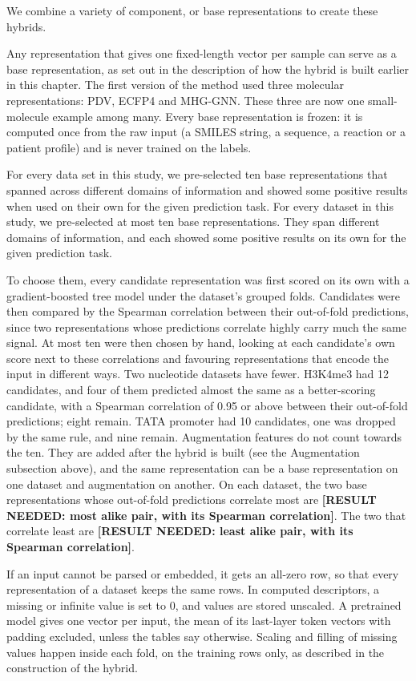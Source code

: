 We combine a variety of component, or base representations to create these hybrids.

Any representation that gives one fixed-length vector per sample can serve as a base representation, as set out in the description of how the hybrid is built earlier in this chapter. The first version of the method used three molecular representations: PDV, ECFP4 and MHG-GNN. These three are now one small-molecule example among many. Every base representation is frozen: it is computed once from the raw input (a SMILES string, a sequence, a reaction or a patient profile) and is never trained on the labels.

For every data set in this study, we pre-selected ten base representations that spanned across different domains of information and showed some positive results when used on their own for the given prediction task.
For every dataset in this study, we pre-selected at most ten base representations. They span different domains of information, and each showed some positive results on its own for the given prediction task.

To choose them, every candidate representation was first scored on its own with a gradient-boosted tree model \citep{ke2017lightgbm} under the dataset's grouped folds. Candidates were then compared by the Spearman correlation between their out-of-fold predictions, since two representations whose predictions correlate highly carry much the same signal. At most ten were then chosen by hand, looking at each candidate's own score next to these correlations and favouring representations that encode the input in different ways. Two nucleotide datasets have fewer. H3K4me3 had 12 candidates, and four of them predicted almost the same as a better-scoring candidate, with a Spearman correlation of 0.95 or above between their out-of-fold predictions; eight remain. TATA promoter had 10 candidates, one was dropped by the same rule, and nine remain. Augmentation features do not count towards the ten. They are added after the hybrid is built (see the Augmentation subsection above), and the same representation can be a base representation on one dataset and augmentation on another.
On each dataset, the two base representations whose out-of-fold predictions correlate most are \textbf{[RESULT NEEDED: most alike pair, with its Spearman correlation]}. The two that correlate least are \textbf{[RESULT NEEDED: least alike pair, with its Spearman correlation]}.

If an input cannot be parsed or embedded, it gets an all-zero row, so that every representation of a dataset keeps the same rows. In computed descriptors, a missing or infinite value is set to 0, and values are stored unscaled. A pretrained model gives one vector per input, the mean of its last-layer token vectors with padding excluded, unless the tables say otherwise. Scaling and filling of missing values happen inside each fold, on the training rows only, as described in the construction of the hybrid.

